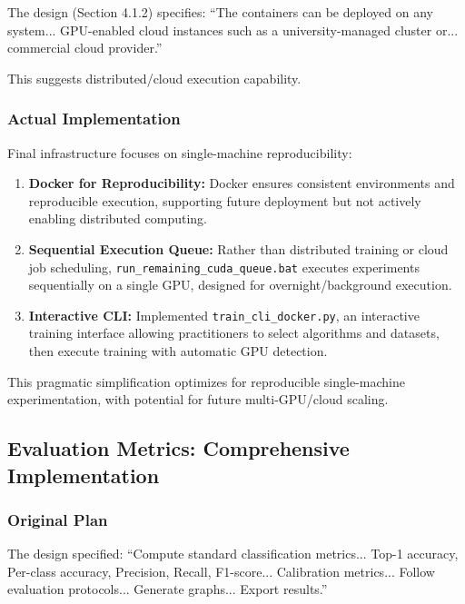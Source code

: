 The design (Section 4.1.2) specifies: ``The containers can be deployed on any system... GPU-enabled cloud instances such as a university-managed cluster or... commercial cloud provider.''

This suggests distributed/cloud execution capability.

\subsubsection{Actual Implementation}

Final infrastructure focuses on single-machine reproducibility:

\begin{enumerate}
    \item \textbf{Docker for Reproducibility:} Docker ensures consistent environments and reproducible execution, supporting future deployment but not actively enabling distributed computing.

    \item \textbf{Sequential Execution Queue:} Rather than distributed training or cloud job scheduling, \texttt{run\_remaining\_cuda\_queue.bat} executes experiments sequentially on a single GPU, designed for overnight/background execution.

    \item \textbf{Interactive CLI:} Implemented \texttt{train\_cli\_docker.py}, an interactive training interface allowing practitioners to select algorithms and datasets, then execute training with automatic GPU detection.
\end{enumerate}

This pragmatic simplification optimizes for reproducible single-machine experimentation, with potential for future multi-GPU/cloud scaling.

\subsection{Evaluation Metrics: Comprehensive Implementation}

\subsubsection{Original Plan}

The design specified: ``Compute standard classification metrics... Top-1 accuracy, Per-class accuracy, Precision, Recall, F1-score... Calibration metrics... Follow evaluation protocols... Generate graphs... Export results.''

